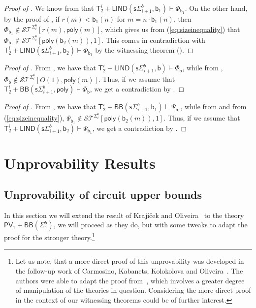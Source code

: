 \documentclass[11pt]{article}
\newcommand{\poly}{\mathsf{poly}}
\newcommand{\PV}{\mathsf{PV}}
\newcommand{\bd}{\mathsf{b}}
\theoremstyle{definition}
\theoremstyle{definition}
\theoremstyle{remark}
\begin{document}
\begin{proof}[Proof of ] We know from  that $\mathsf{T}^i_2+\mathsf{LIND}(\mathsf{s}\Sigma^b_{i+1},\bd_1)\vdash \Phi_{\bd_1}$. On the other hand, by the proof of , if $r(m)<\bd_1(n)$ for $m=n\cdot\bd_1(n)$, then $\Phi_{\bd_1}\not\in \mathcal{ST}^{\Sigma^b_i}[r(m),\poly(m)]$, which gives us from (\ref{eq:sizeinequality}) that $\Phi_{\bd_1}\not\in \mathcal{ST}^{\Sigma^b_i}[\poly(\bd_2(m)),1]$. This comes in contradiction with $\mathsf{T}^i_2+\mathsf{LIND}(\mathsf{s}\Sigma^b_{i+1}, \bd_2)\vdash \Phi_{\bd_1}$ by the witnessing theorem ().
\end{proof}

\begin{proof}[Proof of ] From , we have that $\mathsf{T}^i_2+\mathsf{LIND}(\mathsf{s}\Sigma^b_{i+1},\bd)\vdash \Phi_{\bd}$, while from , $\Phi_{\bd}\not\in \mathcal{ST}^{\Sigma^b_i}[O(1),\poly(m)]$. Thus, if we assume that $\mathsf{T}^i_2+\mathsf{BB}(\mathsf{s}\Sigma^b_{i+1},\poly)\vdash \Phi_{\bd}$, we get a contradiction by .
\end{proof}

\begin{proof}[Proof of ] From , we have that  $\mathsf{T}^i_2+\mathsf{BB}(\mathsf{s}\Sigma^b_{i+1},\bd_1)\vdash \Psi_{\bd_1}$, while from  and from (\ref{eq:sizeinequality}), $\Psi_{\bd_1}\not\in \mathcal{ST}^{\Sigma^b_i}[\poly(\bd_2(m)),1]$. Thus, if we assume that $\mathsf{T}^i_2+\mathsf{LIND}(\mathsf{s}\Sigma^b_{i+1},\bd_2)\vdash \Psi_{\bd_1}$, we get a contradiction by .
\end{proof}


\section{Unprovability Results}\label{sec:unprovability}

\subsection{Unprovability of circuit upper bounds}

In this section we will extend the result of Krajíček and Oliveira~\cite{KO17} to the theory $\PV_1+\mathsf{BB}(\Sigma^b_1)$, we will proceed as they do, but with some tweaks to adapt the proof for the stronger theory.\footnote{Let us note, that a more direct proof of this unprovability was developed in the follow-up work of Carmosino, Kabanets, Kolokolova and Oliveira~\cite{CKKO}. The authors were able to adapt the proof from~\cite{KO17}, which involves a greater degree of manipulation of the theories in question. Considering the more direct proof in the context of our witnessing theorems could be of further interest.}
\end{document}
